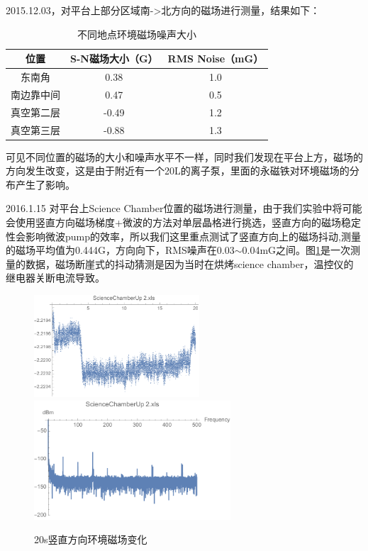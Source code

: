 \documentclass[onecolumn,a4paper,10pt]{article}
\begin{document}
2015.12.03，对平台上部分区域南->北方向的磁场进行测量，结果如下：


\begin{table}[htbp]
\centering

\label{magnetic2}
\begin{tabular}{|c|c|c|}
\hline
位置&S-N磁场大小（G）& RMS Noise（mG）\\
\hline
东南角&0.38  &1.0 \\
\hline
南边靠中间 &0.47  &0.5 \\
\hline
真空第二层 &  -0.49 &1.2 \\
\hline
真空第三层 &  -0.88 &1.3 \\
\hline
\end{tabular}
\caption{不同地点环境磁场噪声大小}
\end{table}

可见不同位置的磁场的大小和噪声水平不一样，同时我们发现在平台上方，磁场的方向发生改变，这是由于附近有一个20L的离子泵，里面的永磁铁对环境磁场的分布产生了影响。

2016.1.15 对平台上Science Chamber位置的磁场进行测量，由于我们实验中将可能会使用竖直方向磁场梯度+微波的方法对单层晶格进行挑选，竖直方向的磁场稳定性会影响微波pump的效率，所以我们这里重点测试了竖直方向上的磁场抖动,测量的磁场平均值为0.444G，方向向下，RMS噪声在0.03$\sim$0.04mG之间。图\ref{fig:1089}是一次测量的数据，磁场断崖式的抖动猜测是因为当时在烘烤science chamber，温控仪的继电器关断电流导致。

\begin{figure}[htbp]
\centering
\includegraphics[height=1.5in]{DATAUP}%
\hspace{0.4in}%
\includegraphics[height=1.75in]{FourierDATAUP}
\caption{20s竖直方向环境磁场变化}
\label{fig:1089}
\end{figure}
\end{document}
